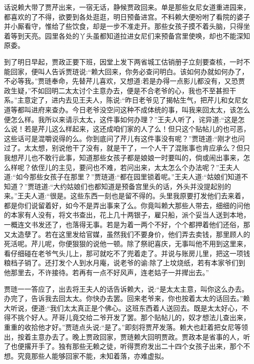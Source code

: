 


\begin{parag}
    话说赖大带了贾芹出来，一宿无话，静候贾政回来。单是那些女尼女道重进园来，都喜欢的了不得，欲要到各处逛逛，明日预备进宫。不料赖大便吩咐了看院的婆子并小厮看守，惟给了些饮食，却是一步不准走开。那些女孩子摸不着头脑，只得坐着等到天亮。园里各处的丫头虽都知道拉进女尼们来预备宫里使唤，却也不能深知原委。
\end{parag}


\begin{parag}
    到了明日早起，贾政正要下班，因堂上发下两省城工估销册子立刻要查核，一时不能回家，便叫人告诉贾琏说:“赖大回来，你务必查问明白。该如何办就如何办了，不必等我。”贾琏奉命，先替芹儿喜欢，又想道:若是办得一点影儿都没有，又恐贾政生疑，”不如回明二太太讨个主意办去，便是不合老爷的心，我也不至甚担干系。”主意定了，进内去见王夫人，陈说:“昨日老爷见了揭帖生气，把芹儿和女尼女道等都叫进府来查办。今日老爷没空问这种不成体统的事，叫我来回太太，该怎么便怎么样。我所以来请示太太，这件事如何办理？”王夫人听了，诧异道:“这是怎么说！若是芹儿这么样起来，这还成咱们家的人了么！但只这个贴帖儿的也可恶，这些话可是混嚼说得的么。你到底问了芹儿有这件事没有呢？”贾琏道:“刚才也问过了。太太想，别说他干了没有，就是干了，一个人干了混账事也肯应承么？但只我想芹儿也不敢行此事，知道那些女孩子都是娘娘一时要叫的，倘或闹出事来，怎么样呢？依侄儿的主见，要问也不难，若问出来，太太怎么个办法呢？”王夫人道:“如今那些女孩子在那里？”贾琏道:“都在园里锁着呢。”王夫人道:“姑娘们知道不知道？”贾琏道:“大约姑娘们也都知道是预备宫里头的话，外头并没提起别的来。”王夫人道:“很是。这些东西一刻也是留不得的。头里我原要打发他们去来着，都是你们说留着好，如今不是弄出事来了么。你竟叫赖大那些人带去，细细的问他的本家有人没有，将文书查出，花上几十两银子，雇只船，派个妥当人送到本地，一概连文书发还了，也落得无事。若是为着一两个不好，个个都押着他们还俗，那又太造孽了。若在这里发给官媒，虽然我们不要身价，他们弄去卖钱，那里顾人的死活呢。芹儿呢，你便狠狠的说他一顿。除了祭祀喜庆，无事叫他不用到这里来，看仔细碰在老爷气头儿上，那可就吃不了兜着走了。并说与账房儿里，把这一项钱粮档子销了。还打发个人到水月庵，说老爷的谕:除了上坟烧纸，若有本家爷们到他那里去，不许接待。若再有一点不好风声，连老姑子一并撵出去。”
\end{parag}


\begin{parag}
    贾琏一一答应了，出去将王夫人的话告诉赖大，说:“是太太主意，叫你这么办去。办完了，告诉我去回太太。你快办去罢。回来老爷来，你也按着太太的话回去。”赖大听说，便道:“我们太太真正是个佛心。这班东西着人送回去。既是太太好心，不得不挑个好人。芹哥儿竟交给二爷开发了罢。那个贴帖儿的，奴才想法儿查出来，重重的收拾他才好。”贾琏点头说:“是了。”即刻将贾芹发落。赖大也赶着把女尼等领出，按着主意办去了。晚上贾政回家，贾琏赖大回明贾政。贾政本是省事的人，听了也便撂开手了。独有那些无赖之徒，听得贾府发出二十四个女孩子出来，那个不想。究竟那些人能够回家不能，未知着落，亦难虚拟。
\end{parag}


